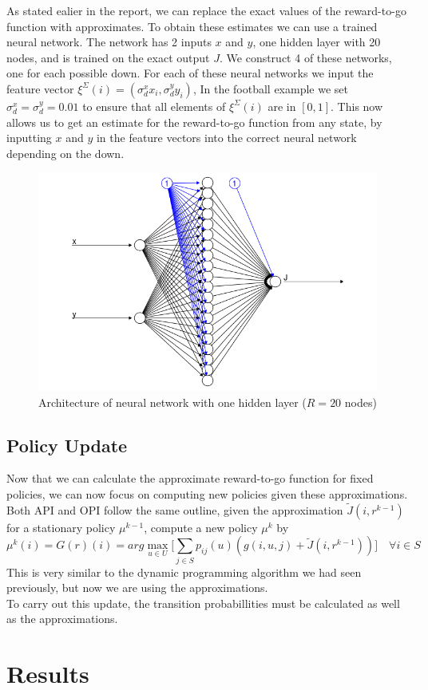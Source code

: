\documentclass[11pt, oneside]{article}   	%
\begin{document}
As stated ealier in the report, we can replace the exact values of the reward-to-go function with approximates. To obtain these estimates we can use a trained neural network. The network has 2 inputs $x$ and $y$, one hidden layer with 20 nodes, and is trained on the exact output $J$. We construct 4 of these networks, one for each possible down. For each of these neural networks we input the feature vector $\xi^{\Sigma}(i) = (\sigma_{d}^{x} x_{i}, \sigma_{d}^{y} y_{i})$, In the football example we set $\sigma_{d}^{x} = \sigma_{d}^{y} = 0.01$ to ensure that all elements of $\xi^{\Sigma}(i)$ are in $[0,1]$. This now allows us to get an estimate for the reward-to-go function from any state, by inputting $x$ and $y$ in the feature vectors into the correct neural network depending on the down. 


\begin{figure}[ht!]
\centering
\includegraphics[width=155mm]{../images/neuralnet.png}
\caption{Architecture of neural network with one hidden layer ($R=20$ nodes)}
\end{figure}

\subsection{Policy Update}
Now that we can calculate the approximate reward-to-go function for fixed policies, we can now focus on computing new policies given these approximations. Both API and OPI follow the same outline, given the approximation $\widetilde{J}(i,r^{k-1})$ for a stationary policy $\mu^{k-1}$, compute a new policy $\mu^{k}$ by
$$
\mu^{k}(i) = G(r)(i) = arg\max\limits_{u \in U} \Big[ \sum\limits_{j \in S} p_{ij}(u)(g(i,u,j) +  \widetilde{J}(i,r^{k-1}))\Big] \quad \forall i \in S
$$
This is very similar to the dynamic programming algorithm we had seen previously, but now we are using the approximations. \\
To carry out this update, the transition probabillities must be calculated as well as the approximations.
\section{Results}
\end{document}
